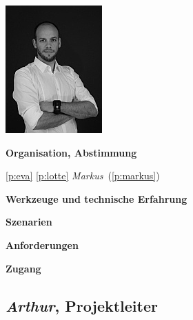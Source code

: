 \begin{multicols}{2}

\begin{center}
\includegraphics[width=0.5\columnwidth]{media/jan.jpg}
\end{center}


\textbf{Organisation, Abstimmung}

\ref{p:eva}
\ref{p:lotte}
\emph{Markus}~(\ref{p:markus})

\textbf{Werkzeuge und technische Erfahrung}

\columnbreak

\textbf{Szenarien}

\textbf{Anforderungen}

\textbf{Zugang}

\end{multicols}

\pagebreak

\subsection{\emph{Arthur}, Projektleiter}\label{p:arthur}


